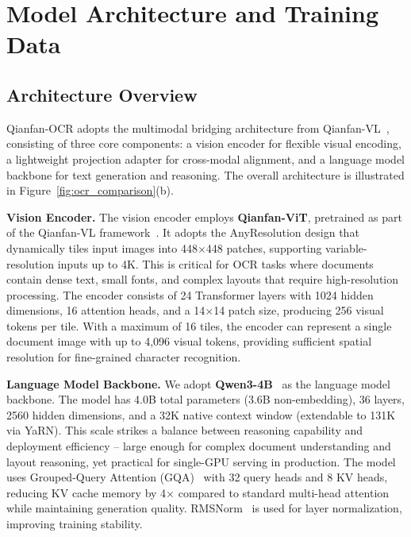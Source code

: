 \documentclass[dvipsnames]{article}
\begin{document}
\section{Model Architecture and Training Data}
\label{sec:architecture}

\subsection{Architecture Overview}

Qianfan-OCR adopts the multimodal bridging architecture from Qianfan-VL~\citep{dong2025qianfanvl}, consisting of three core components: a vision encoder for flexible visual encoding, a lightweight projection adapter for cross-modal alignment, and a language model backbone for text generation and reasoning. The overall architecture is illustrated in Figure~\ref{fig:ocr_comparison}(b).

\textbf{Vision Encoder.}
The vision encoder employs \textbf{Qianfan-ViT}, pretrained as part of the Qianfan-VL framework~\citep{dong2025qianfanvl}. It adopts the AnyResolution design that dynamically tiles input images into 448$\times$448 patches, supporting variable-resolution inputs up to 4K. This is critical for OCR tasks where documents contain dense text, small fonts, and complex layouts that require high-resolution processing. The encoder consists of 24 Transformer layers with 1024 hidden dimensions, 16 attention heads, and a 14$\times$14 patch size, producing 256 visual tokens per tile. With a maximum of 16 tiles, the encoder can represent a single document image with up to 4,096 visual tokens, providing sufficient spatial resolution for fine-grained character recognition.

\textbf{Language Model Backbone.}
We adopt \textbf{Qwen3-4B}~\citep{bai2025qwen2} as the language model backbone. The model has 4.0B total parameters (3.6B non-embedding), 36 layers, 2560 hidden dimensions, and a 32K native context window (extendable to 131K via YaRN). This scale strikes a balance between reasoning capability and deployment efficiency -- large enough for complex document understanding and layout reasoning, yet practical for single-GPU serving in production. The model uses Grouped-Query Attention (GQA)~\citep{ainslie2023gqa} with 32 query heads and 8 KV heads, reducing KV cache memory by 4$\times$ compared to standard multi-head attention while maintaining generation quality. RMSNorm~\citep{zhang2019root} is used for layer normalization, improving training stability.
\end{document}
